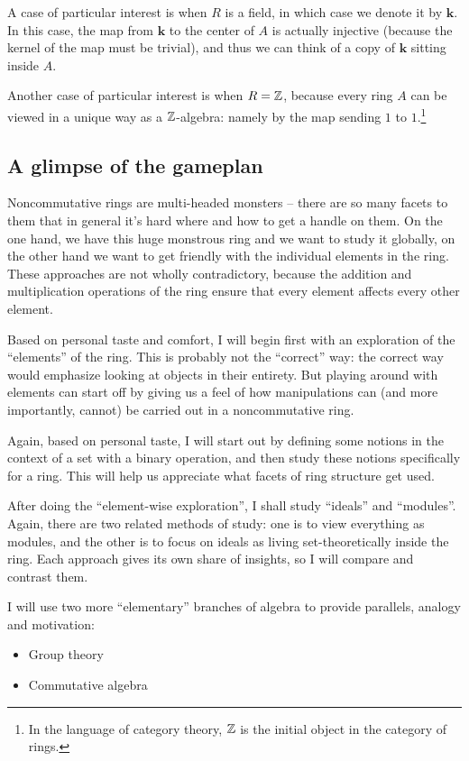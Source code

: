 \documentclass[a4paper]{amsart}
\newcommand{\field}{\mathbf{k}}
\begin{document}
A case of particular interest is when $R$ is a field, in which case we
denote it by $\field$. In this case, the map from $\field$ to the
center of $A$ is actually injective (because the kernel of the map
must be trivial), and thus we can think of a copy of $\field$ sitting
inside $A$.

Another case of particular interest is when $R = \mathbb{Z}$, because every
ring $A$ can be viewed in a unique way as a $\mathbb{Z}$-algebra: namely by
the map sending $1$ to $1$.\footnote{In the language of category
  theory, $\mathbb{Z}$ is the initial object in the category of rings.}
\subsection{A glimpse of the gameplan}

Noncommutative rings are multi-headed monsters -- there are so many
facets to them that in general it's hard where and how to get a handle
on them. On the one hand, we have this huge monstrous ring and we want
to study it globally, on the other hand we want to get friendly with
the individual elements in the ring. These approaches are not wholly
contradictory, because the addition and multiplication operations of
the ring ensure that every element affects every other element.

Based on personal taste and comfort, I will begin first with an
exploration of the ``elements'' of the ring. This is probably not the
``correct'' way: the correct way would emphasize looking at objects in
their entirety. But playing around with elements can start off by
giving us a feel of how manipulations can (and more importantly,
cannot) be carried out in a noncommutative ring.

Again, based on personal taste, I will start out by defining some
notions in the context of a set with a binary operation, and then
study these notions specifically for a ring. This will help us appreciate
what facets of ring structure get used.

After doing the ``element-wise exploration'', I shall study ``ideals''
and ``modules''. Again, there are two related methods of study: one is
to view everything as modules, and the other is to focus on ideals as
living set-theoretically inside the ring. Each approach gives its own
share of insights, so I will compare and contrast them.

I will use two more ``elementary'' branches of algebra to provide
parallels, analogy and motivation:

\begin{itemize}

\item Group theory

\item Commutative algebra

\end{itemize}
\end{document}
